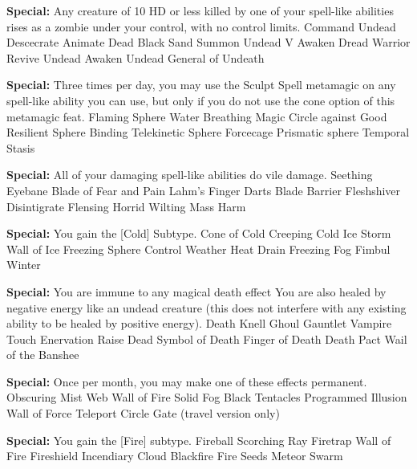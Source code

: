 \textbf{Special: }{Any creature of 10 HD or less killed by one of your spell-like abilities rises as a zombie under your control, with no control limits.}
\sphere
{Command Undead}
{Descecrate}
{Animate Dead}
{Black Sand}
{Summon Undead V}
{Awaken Dread Warrior}
{Revive Undead}
{Awaken Undead}
{General of Undeath}

\textbf{Special: }{Three times per day, you may use the Sculpt Spell metamagic on any spell-like ability you can use, but only if you do not use the cone option of this metamagic feat.}
\sphere
{Flaming Sphere}
{Water Breathing}
{Magic Circle against Good}
{Resilient Sphere}
{Binding}
{Telekinetic Sphere}
{Forcecage}
{Prismatic sphere}
{Temporal Stasis}

\textbf{Special: }{All of your damaging spell-like abilities do vile damage.}
\sphere
{Seething Eyebane}
{Blade of Fear and Pain}
{Lahm's Finger Darts}
{Blade Barrier}
{Fleshshiver}
{Disintigrate}
{Flensing}
{Horrid Wilting}
{Mass Harm}

\textbf{Special: }{You gain the [Cold] Subtype.}
\sphere
{Cone of Cold}
{Creeping Cold}
{Ice Storm}
{Wall of Ice}
{Freezing Sphere}
{Control Weather}
{Heat Drain}
{Freezing Fog}
{Fimbul Winter}

\textbf{Special: }{You are immune to any magical death effect You are also healed by negative energy like an undead creature (this does not interfere with any existing ability to be healed by positive energy).}
\sphere
{Death Knell}
{Ghoul Gauntlet}
{Vampire Touch}
{Enervation}
{Raise Dead}
{Symbol of Death}
{Finger of Death}
{Death Pact}
{Wail of the Banshee}

\textbf{Special: }{Once per month, you may make one of these effects permanent.}
\sphere
{Obscuring Mist}
{Web}
{Wall of Fire}
{Solid Fog}
{Black Tentacles}
{Programmed Illusion}
{Wall of Force}
{Teleport Circle}
{Gate (travel version only)}

\textbf{Special: }{You gain the [Fire] subtype.}
\sphere
{Fireball}
{Scorching Ray}
{Firetrap}
{Wall of Fire}
{Fireshield}
{Incendiary Cloud}
{Blackfire}
{Fire Seeds}
{Meteor Swarm}

